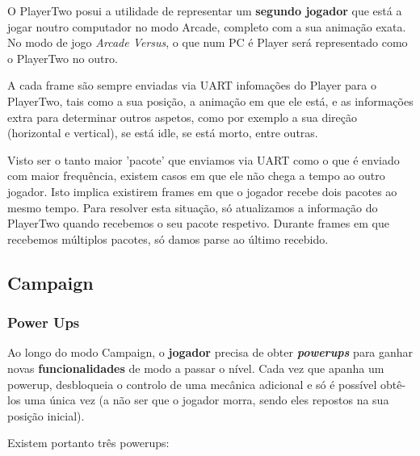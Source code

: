 \documentclass{report}
\begin{document}
O PlayerTwo posui a utilidade de representar um \textbf{segundo jogador} que está a jogar noutro computador no modo Arcade, completo com a sua animação exata. No modo de jogo \textit{Arcade Versus}, o que num PC é Player será representado como o PlayerTwo no outro.

A cada frame são sempre enviadas via UART infomações do Player para o PlayerTwo, tais como a sua posição, a animação em que ele está, e as informações extra para determinar outros aspetos, como por exemplo a sua direção (horizontal e vertical), se está idle, se está morto, entre outras. 

Visto ser o tanto maior 'pacote' que enviamos via UART como o que é enviado com maior frequência, existem casos em que ele não chega a tempo ao outro jogador. Isto implica existirem frames em que o jogador recebe dois pacotes ao mesmo tempo. Para resolver esta situação, só atualizamos a informação do PlayerTwo quando recebemos o seu pacote respetivo. Durante frames em que recebemos múltiplos pacotes, só damos parse ao último recebido.

\subsection{Campaign}


\subsubsection{Power Ups}

Ao longo do modo Campaign, o \textbf{jogador} precisa de obter \textbf{\textit{powerups}} para ganhar novas \textbf{funcionalidades} de modo a passar o nível. Cada vez que apanha um powerup, desbloqueia o controlo de uma mecânica adicional e só é possível obtê-los uma única vez (a não ser que o jogador morra, sendo eles repostos na sua posição inicial).

Existem portanto três powerups:
\end{document}
